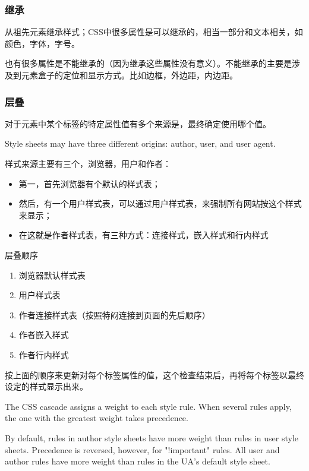 \subsubsection{继承}

从祖先元素继承样式；CSS中很多属性是可以继承的，相当一部分和文本相关，如颜色，字体，字号。

也有很多属性是不能继承的（因为继承这些属性没有意义）。不能继承的主要是涉及到元素盒子的定位和显示方式。比如边框，外边距，内边距。

\subsubsection{层叠}

对于元素中某个标签的特定属性值有多个来源是，最终确定使用哪个值。

Style sheets may have three different origins: author, user, and user agent.

样式来源主要有三个，浏览器，用户和作者：
\begin{itemize}
\item 第一，首先浏览器有个默认的样式表；
\item 然后，有一个用户样式表，可以通过用户样式表，来强制所有网站按这个样式来显示；
\item 在这就是作者样式表，有三种方式：连接样式，嵌入样式和行内样式
\end{itemize}

层叠顺序
\begin{enumerate}
\item 浏览器默认样式表
\item 用户样式表
\item 作者连接样式表（按照特闷连接到页面的先后顺序）
\item 作者嵌入样式
\item 作者行内样式
\end{enumerate}

按上面的顺序来更新对每个标签属性的值，这个检查结束后，再将每个标签以最终设定的样式显示出来。

The CSS cascade assigns a weight to each style rule. When several rules apply, the one with the greatest weight takes precedence. 

By default, rules in author style sheets have more weight than rules in user style sheets. Precedence is reversed, however, for "!important" rules. All user and author rules have more weight than rules in the UA's default style sheet. 


